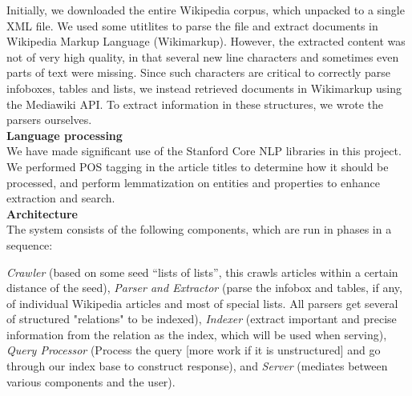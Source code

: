 \documentclass[11pt,twocolumn]{article}
\begin{document}
Initially, we downloaded the entire Wikipedia corpus, which unpacked to a single XML file. We used some utitlites to parse the file and extract documents in Wikipedia Markup Language (Wikimarkup). However, the extracted content was not of very high quality, in that several new line characters and sometimes even parts of text were missing. Since such characters are critical to correctly parse infoboxes, tables and lists, we instead retrieved documents in Wikimarkup using the Mediawiki API. To extract information in these structures, we wrote the parsers ourselves.\\

{\bf Language processing}\\

We have made significant use of the Stanford Core NLP libraries in this project. We performed POS tagging in the article titles to determine how it should be processed, and perform lemmatization on entities and properties to enhance extraction and search.\\

{\bf Architecture}\\

The system consists of the following components, which are run in phases in a sequence:

\emph{Crawler} (based on some seed ``lists of lists'', this crawls articles within a certain distance of the seed), \emph{Parser and Extractor} (parse the infobox and tables, if any, of individual Wikipedia articles and most of special lists. All parsers get several of structured "relations" to be indexed), \emph{Indexer} (extract important and precise information from the relation as the index, which will be used when serving), \emph{Query Processor}  (Process the query [more work if it is unstructured] and go through our index base to construct response), and \emph{Server} (mediates between various components and the user).




\end{document}
